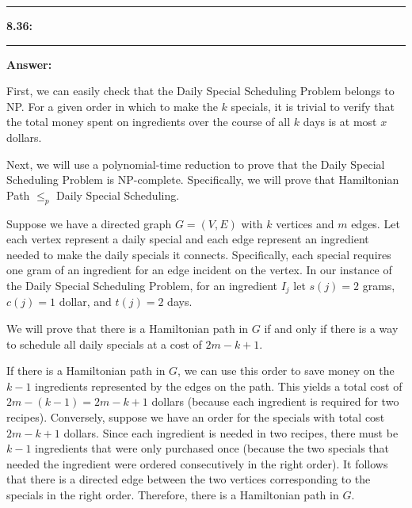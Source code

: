 \documentclass[11pt]{article}
\newcommand\question[2]{\vspace{.25in}\hrule\textbf{#1: #2}\vspace{.5em}\hrule\vspace{.10in}}
\newcommand\answer{\vspace{.10in}\textbf{Answer: }}
\begin{document}
\clearpage

\question{8.36}{}

\answer

First, we can easily check that the Daily Special Scheduling Problem belongs to NP. For a given order in which to make the $k$ specials, it is trivial to verify that the total money spent on ingredients over the course of all $k$ days is at most $x$ dollars.\newline

Next, we will use a polynomial-time reduction to prove that the Daily Special Scheduling Problem is NP-complete. Specifically, we will prove that Hamiltonian Path $\leq_p$ Daily Special Scheduling.\newline

Suppose we have a directed graph $G = (V, E)$ with $k$ vertices and $m$ edges. Let each vertex represent a daily special and each edge represent an ingredient needed to make the daily specials it connects. Specifically, each special requires one gram of an ingredient for an edge incident on the vertex. In our instance of the Daily Special Scheduling Problem, for an ingredient $I_j$ let $s(j) = 2$ grams, $c(j) = 1$ dollar, and $t(j) = 2$ days.\newline

We will prove that there is a Hamiltonian path in $G$ if and only if there is a way to schedule all daily specials at a cost of $2m - k + 1$.\newline

If there is a Hamiltonian path in $G$, we can use this order to save money on the $k - 1$ ingredients represented by the edges on the path. This yields a total cost of $2m - (k - 1) = 2m - k + 1$ dollars (because each ingredient is required for two recipes). Conversely, suppose we have an order for the specials with total cost $2m - k + 1$ dollars. Since each ingredient is needed in two recipes, there must be $k - 1$ ingredients that were only purchased once (because the two specials that needed the ingredient were ordered consecutively in the right order). It follows that there is a directed edge between the two vertices corresponding to the specials in the right order. Therefore, there is a Hamiltonian path in $G$.

\clearpage
\end{document}
